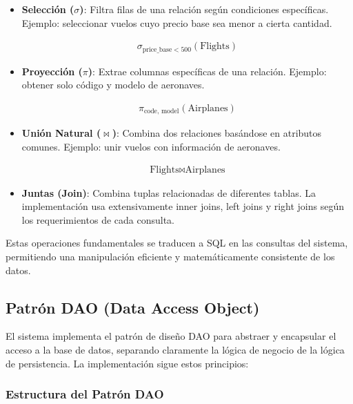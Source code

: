 \documentclass[12pt,a4paper]{article}
\begin{document}
\begin{itemize}
    \item \textbf{Selección ($\sigma$)}: Filtra filas de una relación según condiciones específicas. Ejemplo: seleccionar vuelos cuyo precio base sea menor a cierta cantidad.

    \begin{align}
    \sigma_{\text{price\_base} < 500}(\text{Flights})
    \end{align}

    \item \textbf{Proyección ($\pi$)}: Extrae columnas específicas de una relación. Ejemplo: obtener solo código y modelo de aeronaves.

    \begin{align}
    \pi_{\text{code, model}}(\text{Airplanes})
    \end{align}

    \item \textbf{Unión Natural ($\bowtie$)}: Combina dos relaciones basándose en atributos comunes. Ejemplo: unir vuelos con información de aeronaves.

    \begin{align}
    \text{Flights} \bowtie \text{Airplanes}
    \end{align}

    \item \textbf{Juntas (Join)}: Combina tuplas relacionadas de diferentes tablas. La implementación usa extensivamente inner joins, left joins y right joins según los requerimientos de cada consulta.
\end{itemize}

Estas operaciones fundamentales se traducen a SQL en las consultas del sistema, permitiendo una manipulación eficiente y matemáticamente consistente de los datos.

\subsection{Patrón DAO (Data Access Object)}

El sistema implementa el patrón de diseño DAO para abstraer y encapsular el acceso a la base de datos, separando claramente la lógica de negocio de la lógica de persistencia. La implementación sigue estos principios:

\subsubsection{Estructura del Patrón DAO}
\end{document}
